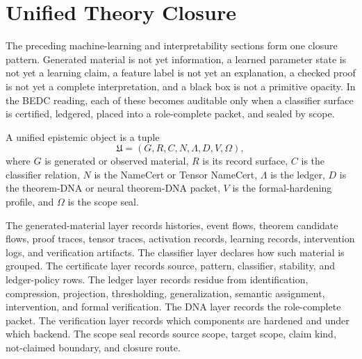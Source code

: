 \section{Unified Theory Closure}
\label{sec:visions-philosophy-unified-theory-closure}

The preceding machine-learning and interpretability sections form one
closure pattern. Generated material is not yet information, a learned
parameter state is not yet a learning claim, a feature label is not yet
an explanation, a checked proof is not yet a complete interpretation,
and a black box is not a primitive opacity. In the BEDC reading, each of
these becomes auditable only when a classifier surface is certified,
ledgered, placed into a role-complete packet, and sealed by scope.

\begin{definition}
\label{def:philosophy-unified-epistemic-object}
A unified epistemic object is a tuple
$$
\mathfrak U=(G,R,C,N,\Lambda,D,V,\Omega),
$$
where $G$ is generated or observed material, $R$ is its record surface,
$C$ is the classifier relation, $N$ is the NameCert or Tensor NameCert,
$\Lambda$ is the ledger, $D$ is the theorem-DNA or neural theorem-DNA
packet, $V$ is the formal-hardening profile, and $\Omega$ is the scope
seal.
\end{definition}


\begin{definition}
\label{def:philosophy-unified-layers}
The generated-material layer records histories, event flows, theorem
candidate flows, proof traces, tensor traces, activation records,
learning records, intervention logs, and verification artifacts. The
classifier layer declares how such material is grouped. The certificate
layer records source, pattern, classifier, stability, and ledger-policy
rows. The ledger layer records residue from identification, compression,
projection, thresholding, generalization, semantic assignment,
intervention, and formal verification. The DNA layer records the
role-complete packet. The verification layer records which components
are hardened and under which backend. The scope seal records source
scope, target scope, claim kind, not-claimed boundary, and closure route.
\end{definition}

